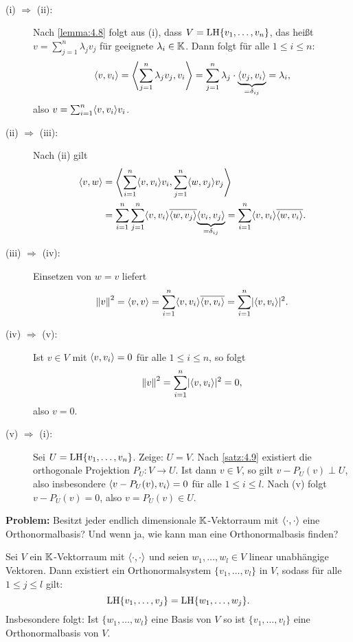 \begin{beweis}
	\mbox{} \\[-.85cm]
	\begin{description}
		\item[(i) $\Rightarrow$ (ii):] Nach \autoref{lemma:4.8} folgt aus (i), dass $V = \operatorname{LH}\{v_1,\dots,v_n\}$, das heißt $v = \sum_{j=1}^{n} \lambda_j v_j$ für geeignete $\lambda_i \in \mathbb{K}$.
		Dann folgt für alle $1 \leq i \leq n$:
		\[
			\left\langle v,v_i\right\rangle = \left\langle\sum_{j=1}^{n} \lambda_j v_j, v_i\right\rangle = \sum_{j=1}^{n} \lambda_j \cdot {\underbrace{\left\langle v_j,v_i\right\rangle}_{=\delta_{ij}}} = \lambda_i,
		\]
		also $v = \sum_{i=1}^{n} \sk{v,v_i} v_i$.
		\item[(ii) $\Rightarrow$ (iii):] Nach (ii) gilt
		\begin{align*}
			\sk{v,w} &= \sk{\sum_{i=1}^{n} \sk{v,v_i} v_i, \sum_{j=1}^{n} \sk{w,v_j} v_j} \\
			&= \sum_{i=1}^{n} \sum_{j=1}^{n} \sk{v,v_i} \ol{\sk{w,v_j}} \Underbrace{\sk{v_i,v_j}}{=\delta_{ij}} = \sum_{i=1}^{n} \sk{v,v_i} \ol{\sk{w,v_i}}.
		\end{align*}
		\item[(iii) $\Rightarrow$ (iv):] Einsetzen von $w = v$ liefert
		\[
			\no{v}^2 = \sk{v,v} = \sum_{i=1}^{n} \sk{v,v_i} \ol{\sk{v,v_i}} = \sum_{i=1}^{n} \abs{\sk{v,v_i}}^2.
		\]
		\item[(iv) $\Rightarrow$ (v):] Ist $v \in V$ mit $\left\langle v,v_i\right\rangle = 0$ für alle $1 \leq i \leq n$, so folgt
		\[
			\left\lVert v\right\rVert^2 = \sum_{i=1}^{n} \lvert\left\langle v,v_i\right\rangle\rvert^2 = 0,
		\]
		also $v = 0$.
		\item[(v) $\Rightarrow$ (i):] Sei $U = \operatorname{LH}\{v_1,\dots,v_n\}$.
		Zeige: $U = V$.
		Nach \autoref{satz:4.9} existiert die orthogonale Projektion $P_U\colon V \rightarrow U$.
		Ist dann $v \in V$, so gilt $v - P_U(v) \perp U$, also insbesondere $\left\langle v-P_U(v),v_i\right\rangle = 0$ für alle $1 \leq i \leq l$.
		Nach (v) folgt $v - P_U(v) = 0$, also $v = P_U(v) \in U$. \qedhere
	\end{description}
\end{beweis}

\textbf{Problem:} Besitzt jeder endlich dimensionale $\mathbb{K}$-Vektorraum mit $\left\langle\cdot,\cdot\right\rangle$ eine Orthonormalbasis?
Und wenn ja, wie kann man eine Orthonormalbasis finden?

\begin{satz}
	\label{satz:4.13}
	Sei $V$ ein $\mathbb{K}$-Vektorraum mit $\left\langle\cdot,\cdot\right\rangle$ und seien $w_1,\dots,w_l \in V$ linear unabhängige Vektoren.
	Dann existiert ein Orthonormalsystem $\{v_1,\dots,v_l\}$ in $V$, sodass für alle $1 \leq j \leq l$ gilt:
	\[
		\operatorname{LH}\{v_1,\dots,v_j\} = \operatorname{LH}\{w_1,\dots,w_j\}.
	\]
	Insbesondere folgt:
	Ist $\{w_1,\dots,w_l\}$ eine Basis von $V$ so ist $\{v_1,\dots,v_l\}$ eine Orthonormalbasis von $V$. 
\end{satz}

